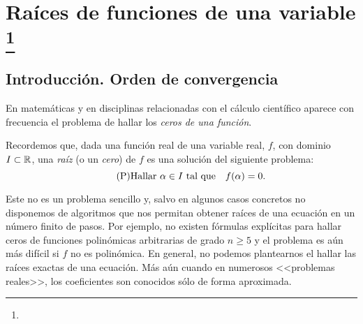 
\chapter[Raíces de funciones de una variable]{Raíces de funciones de una variable%
  \footnote{\licenseInfo}}
\label{cha:ecuaciones-una-variable}

\section{Introducción. Orden de convergencia}
\label{sec:intro-orden-convergencia}

En matemáticas y en disciplinas relacionadas con el cálculo científico
aparece con frecuencia el problema de hallar los \textit{ceros de una
  función}.
\begin{center}
\end{center}

Recordemos que, dada una función real de una variable real, $f$, con
dominio $I\subset\operatorname{{\mathbb R}}$, una \textit{raíz} (o un \textit{cero}) de $f$
es una solución del siguiente problema:
\begin{equation}
  \label{eq:raiz}
  \tag{P}
  \text{Hallar $\alpha\in I$ tal que} \quad f(\alpha)=0.
\end{equation}


Este no es un problema sencillo y, salvo en algunos casos concretos no
disponemos de algoritmos que nos permitan obtener raíces de una
ecuación en un número finito de pasos. Por ejemplo, no existen
fórmulas explícitas para hallar ceros de funciones polinómicas
arbitrarias de grado $n\ge 5$ y el problema es aún más difícil si $f$
no es polinómica. En general, no podemos plantearnos el hallar las
raíces exactas de una ecuación. Más aún cuando en numerosos <<problemas
reales>>, los coeficientes son conocidos sólo de forma aproximada.

